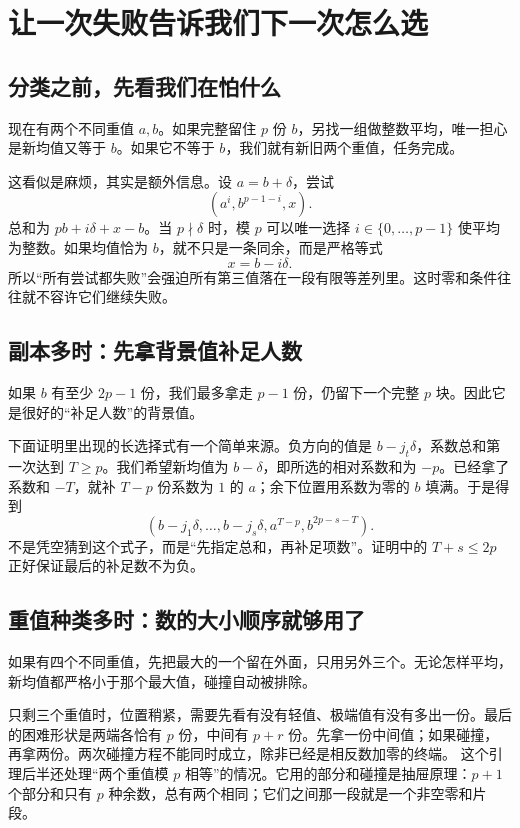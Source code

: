\chapter{让一次失败告诉我们下一次怎么选}\label{ch:descent-finish}
\section{分类之前，先看我们在怕什么}
现在有两个不同重值 $a,b$。如果完整留住 $p$ 份 $b$，另找一组做整数平均，唯一担心是新均值又等于 $b$。如果它不等于 $b$，我们就有新旧两个重值，任务完成。

这看似是麻烦，其实是额外信息。设 $a=b+\delta$，尝试
\[(a^i,b^{p-1-i},x).
\]
总和为 $pb+i\delta+x-b$。当 $p\nmid\delta$ 时，模 $p$ 可以唯一选择 $i\in\{0,\ldots,p-1\}$ 使平均为整数。如果均值恰为 $b$，就不只是一条同余，而是严格等式
\[x=b-i\delta.
\]
所以“所有尝试都失败”会强迫所有第三值落在一段有限等差列里。这时零和条件往往就不容许它们继续失败。

\section{副本多时：先拿背景值补足人数}
如果 $b$ 有至少 $2p-1$ 份，我们最多拿走 $p-1$ 份，仍留下一个完整 $p$ 块。因此它是很好的“补足人数”的背景值。

下面证明里出现的长选择式有一个简单来源。负方向的值是 $b-j_t\delta$，系数总和第一次达到 $T\ge p$。我们希望新均值为 $b-\delta$，即所选的相对系数和为 $-p$。已经拿了系数和 $-T$，就补 $T-p$ 份系数为 $1$ 的 $a$；余下位置用系数为零的 $b$ 填满。于是得到
\[(b-j_1\delta,\ldots,b-j_s\delta,a^{T-p},b^{2p-s-T}).
\]
不是凭空猜到这个式子，而是“先指定总和，再补足项数”。证明中的 $T+s\le2p$ 正好保证最后的补足数不为负。

\section{重值种类多时：数的大小顺序就够用了}
如果有四个不同重值，先把最大的一个留在外面，只用另外三个。无论怎样平均，新均值都严格小于那个最大值，碰撞自动被排除。

只剩三个重值时，位置稍紧，需要先看有没有轻值、极端值有没有多出一份。最后的困难形状是两端各恰有 $p$ 份，中间有 $p+r$ 份。先拿一份中间值；如果碰撞，再拿两份。两次碰撞方程不能同时成立，除非已经是相反数加零的终端。
这个引理后半还处理“两个重值模 $p$ 相等”的情况。它用的部分和碰撞是抽屉原理：$p+1$ 个部分和只有 $p$ 种余数，总有两个相同；它们之间那一段就是一个非空零和片段。

